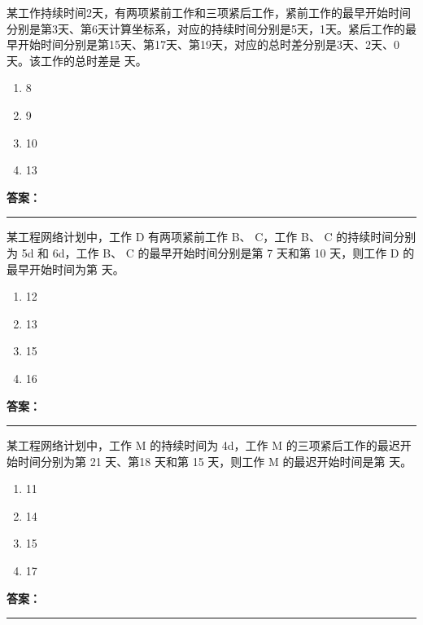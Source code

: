 \documentclass[UTF8,fontset=fandol,11pt]{ctexart}
\newcommand{\answerline}{\textcolor{answerred}{\rule{2.4cm}{0.7pt}}}
\begin{document}
\vspace{0.2em}

\begin{quizbox}[title={第 5 题}]
某工作持续时间2天，有两项紧前工作和三项紧后工作，紧前工作的最早开始时间分别是第3天、第6天计算坐标系，对应的持续时间分别是5天，1天。紧后工作的最早开始时间分别是第15天、第17天、第19天，对应的总时差分别是3天、2天、0天。该工作的总时差是 天。\\
\begin{enumerate}[label=\Alph*.]
\item 8
\item 9
\item 10
\item 13
\end{enumerate}
\textbf{\textcolor{answerred}{答案：}} \answerline
\end{quizbox}

\vspace{0.2em}

\begin{quizbox}[title={第 6 题}]
某工程网络计划中，工作 D 有两项紧前工作 B、 C，工作 B、 C 的持续时间分别为 5d 和 6d，工作 B、 C 的最早开始时间分别是第 7 天和第 10 天，则工作 D 的最早开始时间为第 天。\\
\begin{enumerate}[label=\Alph*.]
\item 12
\item 13
\item 15
\item 16
\end{enumerate}
\textbf{\textcolor{answerred}{答案：}} \answerline
\end{quizbox}

\vspace{0.2em}

\begin{quizbox}[title={第 7 题}]
某工程网络计划中，工作 M 的持续时间为 4d，工作 M 的三项紧后工作的最迟开始时间分别为第 21 天、第18 天和第 15 天，则工作 M 的最迟开始时间是第 天。\\
\begin{enumerate}[label=\Alph*.]
\item 11
\item 14
\item 15
\item 17
\end{enumerate}
\textbf{\textcolor{answerred}{答案：}} \answerline
\end{quizbox}

\vspace{0.2em}
\end{document}
